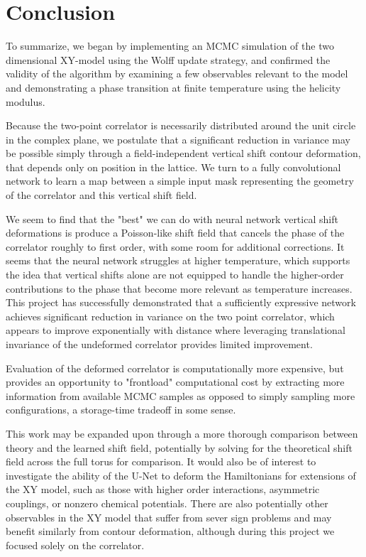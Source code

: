 \documentclass[12pt]{article}
\begin{document}
\section{Conclusion}

To summarize, we began by implementing an MCMC simulation of the two dimensional XY-model using the Wolff update strategy, 
and confirmed the validity of the algorithm by examining a few observables relevant to the model and demonstrating a phase transition
at finite temperature  using the helicity modulus.

Because the two-point correlator is necessarily distributed around the unit circle in the complex plane, we postulate that a significant
reduction in variance may be possible simply through a field-independent vertical shift contour deformation, that depends only
on position in the lattice. We turn to a fully convolutional network to learn a map between a simple input mask representing the
geometry of the correlator and this vertical shift field. 

We seem to find that the "best" we can do with neural network vertical shift deformations is produce a Poisson-like shift field
that cancels the phase of the correlator roughly to first order, with some room for additional corrections. It seems that the 
neural network struggles at higher temperature, which supports the idea that vertical shifts alone are not equipped to handle the higher-order contributions to the phase that become
more relevant as temperature increases. This project has successfully demonstrated that a sufficiently expressive network achieves significant reduction in variance on the two point correlator, which appears
to improve exponentially with distance where leveraging translational invariance of the undeformed correlator provides limited improvement.

Evaluation of the deformed correlator is computationally more expensive, but provides an opportunity to "frontload" computational cost
by extracting more information from available MCMC samples as opposed to simply sampling more configurations, a storage-time tradeoff in some sense.

This work may be expanded upon through a more thorough comparison between theory and the learned shift field, potentially by solving for
the theoretical shift field across the full torus for comparison. It would also be of interest to investigate the ability of the U-Net to deform the Hamiltonians
for extensions of the XY model, such as those with higher order interactions, asymmetric couplings, or nonzero chemical potentials. There are also potentially other observables in the XY model that suffer from sever sign problems and may benefit similarly from contour
deformation, although during this project we focused solely on the correlator.
\end{document}
